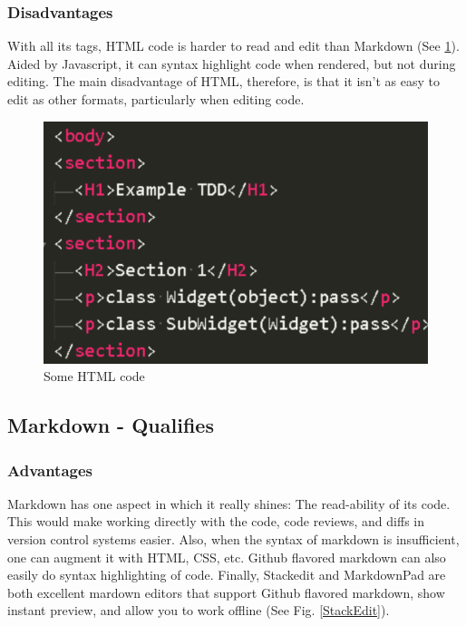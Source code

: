 \documentclass[]{article}
\begin{document}
	\subsubsection{Disadvantages}
		With all its tags, HTML code is harder to read and edit than Markdown (See \ref{HTML code}).  Aided by Javascript, it can syntax highlight code when rendered, but not during editing.  The main disadvantage of HTML, therefore, is that it isn't as easy to edit as other formats, particularly when editing code.
		\begin{figure}[h]
			\centering
			\includegraphics[scale=.25]{HTML_code.PNG}
			\caption{Some HTML code}
			\label{HTML code}
		\end{figure}
		

\subsection{Markdown - Qualifies}
	\subsubsection{Advantages}
	Markdown has one aspect in which it really shines: The read-ability of its code.  This would make working directly with the code, code reviews, and diffs in version control systems easier.  Also, when the syntax of markdown is insufficient, one can augment it with HTML, CSS, etc.  Github flavored markdown can also easily do syntax highlighting of code.  Finally, Stackedit and MarkdownPad are both excellent mardown editors that support Github flavored markdown, show instant preview, and allow you to work offline (See Fig. \ref{StackEdit}).
	
\end{document}
